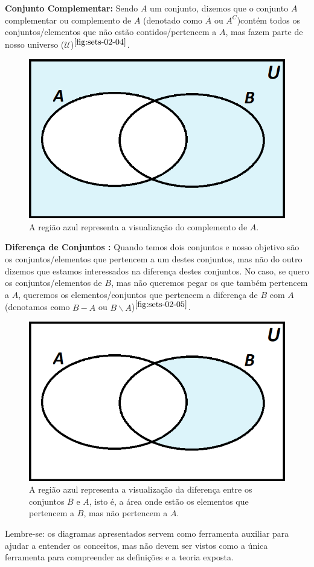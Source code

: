   \textbf{Conjunto Complementar:} Sendo $A$ um conjunto, dizemos que o conjunto $A$ complementar ou complemento de $A$ (denotado como $\overline A$ ou $A^C$)contém todos os conjuntos/elementos que não estão contidos/pertencem a $A$, mas fazem parte de nosso universo ($\mathcal U$)$^{\ref{fig:sets-02-04}}$.

  \begin{figure}[hbt!]
      \centering
      \includegraphics[width = 7 cm]{figures/sets/fig-sets-02-04.png}
      \caption{A região azul representa a visualização do complemento de $A$.}
      \label{fig:sets-02-04}
  \end{figure}

  \textbf{Diferença de Conjuntos :} Quando temos dois conjuntos e nosso objetivo são os conjuntos/elementos que pertencem a um destes conjuntos, mas não do outro dizemos que estamos interessados na diferença destes conjuntos. No caso, se quero os conjuntos/elementos de $B$, mas não queremos pegar os que também pertencem a $A$, queremos os elementos/conjuntos que pertencem a diferença de $B$ com $A$ (denotamos como $B-A$ ou $B \backslash A$)$^{\ref{fig:sets-02-05}}$.

  \begin{figure}[hbt!]
      \centering
      \includegraphics[width = 7 cm]{figures/sets/fig-sets-02-05.png}
      \caption{A região azul representa a visualização da diferença entre os conjuntos $B$ e $A$, isto é, a área onde estão os elementos que pertencem a $B$, mas não pertencem a $A$.}
      \label{fig:sets-02-05}
  \end{figure}

  Lembre-se: os diagramas apresentados servem como ferramenta auxiliar para ajudar a entender os conceitos, mas não devem ser vistos como a única ferramenta para compreender as definições e  a teoria exposta.

